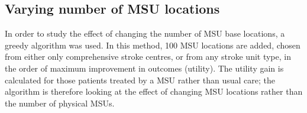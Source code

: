 \subsection{Varying number of MSU locations}

In order to study the effect of changing the number of MSU base locations, a greedy algorithm was used. In this method, 100 MSU locations are added, chosen from either only comprehensive stroke centres, or from any stroke unit type, in the order of maximum improvement in outcomes (utility). The utility gain is calculated for those patients treated by a MSU rather than usual care; the algorithm is therefore looking at the effect of changing MSU locations rather than the number of physical MSUs.